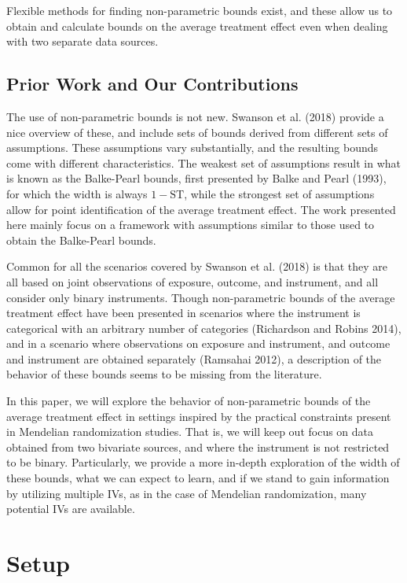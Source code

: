 \documentclass[
]{article}
\theoremstyle{plain}
\begin{document}
Flexible methods for finding non-parametric bounds exist, and these allow us to obtain and calculate bounds on the average treatment effect even when dealing with two separate data sources.

\hypertarget{prior-work-and-our-contributions}{%
\subsection{Prior Work and Our Contributions}\label{prior-work-and-our-contributions}}

The use of non-parametric bounds is not new. Swanson et al. (2018) provide a nice overview of these, and include sets of bounds derived from different sets of assumptions. These assumptions vary substantially, and the resulting bounds come with different characteristics. The weakest set of assumptions result in what is known as the Balke-Pearl bounds, first presented by Balke and Pearl (1993), for which the width is always \(1-\text{ST}\), while the strongest set of assumptions allow for point identification of the average treatment effect. The work presented here mainly focus on a framework with assumptions similar to those used to obtain the Balke-Pearl bounds.

Common for all the scenarios covered by Swanson et al. (2018) is that they are all based on joint observations of exposure, outcome, and instrument, and all consider only binary instruments. Though non-parametric bounds of the average treatment effect have been presented in scenarios where the instrument is categorical with an arbitrary number of categories (Richardson and Robins 2014), and in a scenario where observations on exposure and instrument, and outcome and instrument are obtained separately (Ramsahai 2012), a description of the behavior of these bounds seems to be missing from the literature.

In this paper, we will explore the behavior of non-parametric bounds of the average treatment effect in settings inspired by the practical constraints present in Mendelian randomization studies. That is, we will keep out focus on data obtained from two bivariate sources, and where the instrument is not restricted to be binary. Particularly, we provide a more in-depth exploration of the width of these bounds, what we can expect to learn, and if we stand to gain information by utilizing multiple IVs, as in the case of Mendelian randomization, many potential IVs are available.

\hypertarget{setup}{%
\section{Setup}\label{setup}}
\end{document}
